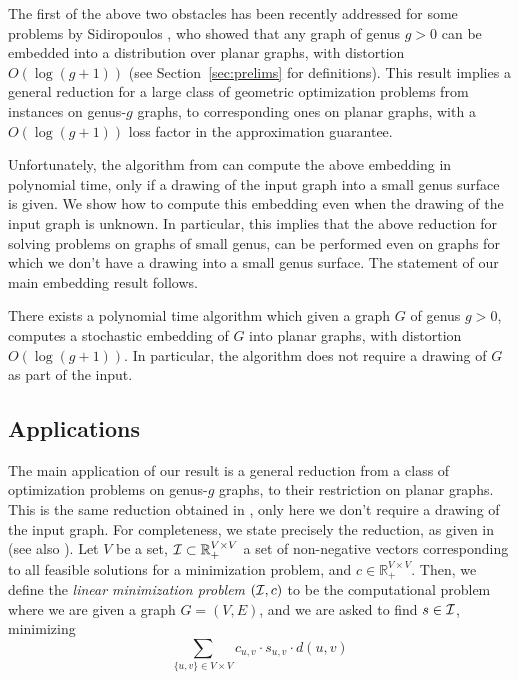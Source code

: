 \documentclass[envcountsect]{llncs}
\begin{document}
The first of the above two obstacles has been recently addressed for some problems by Sidiropoulos \cite{sidiropoulos2010optimal}, who showed that any graph of genus $g>0$ can be embedded into a distribution over planar graphs, with distortion $O(\log (g+1))$ (see Section~\ref{sec:prelims} for definitions).
This result implies a general reduction for a large class of geometric optimization problems from instances on genus-$g$ graphs, to corresponding ones on planar graphs, with a $O(\log (g+1))$ loss factor in the approximation guarantee. 

Unfortunately, the algorithm from \cite{sidiropoulos2010optimal} can compute the above embedding in polynomial time, only if a drawing of the input graph into a small genus surface is given.
We show how to compute this embedding even when the drawing of the input graph is unknown.
In particular, this implies that the above reduction for solving problems on graphs of small genus, can be performed even on graphs for which we don't have a drawing into a small genus surface.
The statement of our main embedding result follows.

\begin{theorem}\label{tim:main}
There exists a polynomial time algorithm which given a graph $G$ of genus $g>0$, computes a stochastic embedding of $G$ into planar graphs, with distortion $O(\log (g+1))$.
In particular, the algorithm does not require a drawing of $G$ as part of the input.
\end{theorem}

\iffalse
\begin{theorem}[Planarization of an unknown surface]\label{thm:main}
Any graph $G$ of genus $g$, admits a stochastic embedding into planar graphs, with distortion $O(\log g)$.
Moreover, given a drawing of $G$ into a genus-$g$ surface, the embedding can be computed in polynomial time.
\end{theorem}
\fi

\subsection{Applications}

The main application of our result is a general
reduction from a class of optimization problems on
genus-$g$ graphs, to their restriction on planar graphs.
This is the same reduction obtained in \cite{sidiropoulos2010optimal},
only here we don't require a drawing of the input graph.
For completeness, we state precisely the reduction, as given in \cite{sidiropoulos2010optimal} (see also \cite{Bar96}).
Let $V$ be a set,
${\cal I}\subset \mathbb{R}_+^{V\times V}$ a set of non-negative vectors corresponding to all feasible solutions for a minimization problem, and $c \in \mathbb{R}_+^{V\times V}$.
Then, we define the \emph{linear minimization problem} $({\cal I}, c)$ to be the computational problem where we are given a graph $G=(V,E)$, and we are asked to find $s\in {\cal I}$, minimizing
\[
\sum_{\{u,v\}\in V\times V} c_{u,v} \cdot s_{u,v} \cdot d(u,v)
\]
\end{document}
